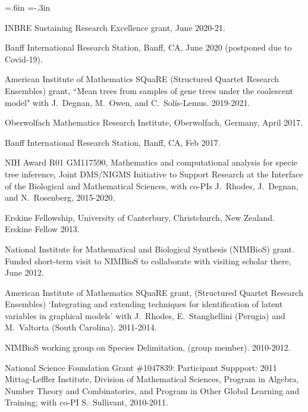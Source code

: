 \documentclass[10pt]{report}
\begin{document}
{ \leftskip=.6in \parindent=-.3in  \parskip=3pt

INBRE Sustaining Research Excellence grant, 
June 2020-21.  

Banff International Research Station, Banff, CA, June 2020 (postponed due to Covid-19).

American Institute of Mathematics SQuaRE (Structured Quartet Research Ensembles) grant, 
``Mean trees from samples of gene trees under the coalescent model" with J.~Degnan, M.~Owen,
and C.~Sol\'is-Lemus.
2019-2021.

Oberwolfach Mathematics Research Institute, Oberwolfach, Germany, April 2017. 

Banff International Research Station, Banff, CA, Feb 2017.

NIH Award R01 GM117590,
Mathematics and computational analysis for specie tree inference, Joint DMS/NIGMS Initiative to Support 
Research at the Interface of the Biological and Mathematical Sciences, with co-PIs J.~Rhodes, J.~Degnan, and N.~Rosenberg,
 2015-2020.

Erskine Fellowship, University of Canterbury, Christchurch, New Zealand.  Erskine Fellow 2013.

{}

National Institute for Mathematical and Biological Synthesis (NIMBioS) grant.  Funded short-term
visit to NIMBioS to collaborate with visiting scholar there,  June 2012.


American Institute of Mathematics SQuaRE grant, (Structured Quartet Research Ensembles)
`Integrating and extending techniques for identification of latent variables in graphical models'
with J.~Rhodes, E.~Stanghellini (Perugia) and M.~Valtorta (South Carolina).  
{}
2011-2014.

NIMBioS working group on Species Delimitation, (group member).
2010-2012.

National Science Foundation Grant \#1047839:  Participant Suppport:
2011 Mittag-Leffler Institute, Division of Mathematical Sciences,
Program in Algebra, Number Theory and Combinatorics, and Program
in Other Global Learning and Training; with co-PI S.~Sullivant,
2010-2011.

}
\end{document}
